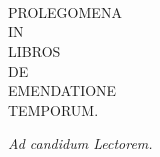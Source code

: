 
\chapter[Prolegomena]{}
\begin{center}
\begin{textsc}
\\
\Huge PROLEGOMENA\\
\Large IN\\
LIBROS\\
DE\\
\Huge EMENDATIONE\\
\Large TEMPORUM.\\
\end{textsc}
\em{Ad candidum Lectorem.}
\end{center}
\normalsize
